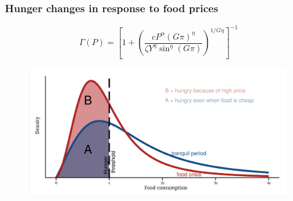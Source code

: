 \documentclass[svgnames]{beamer}
\begin{document}
\begin{frame}
\frametitle{Hunger changes in response to food prices}
\begin{equation}
  \Gamma(P) = \left[1+\left(\frac{cP^\alpha (G\pi)^\eta}{\zeta Y^\eta\sin^\eta(G\pi)}\right)^{1/{G\eta}}\right]^{-1}
\end{equation}


\begin{figure}
\centering
\includegraphics[width=\textwidth]{fig-Food-Distribution}
\end{figure}
\end{frame}
\end{document}
